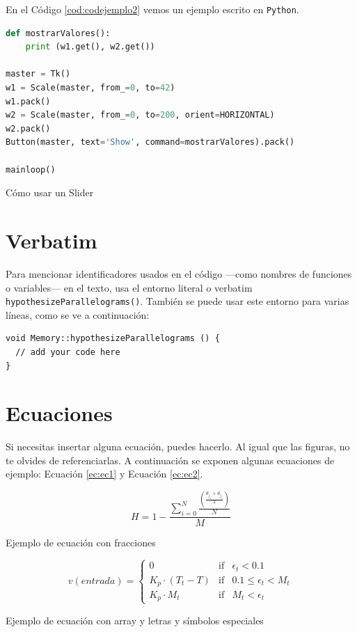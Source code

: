 En el Código \ref{cod:codejemplo2} vemos un ejemplo escrito en \texttt{Python}.

\begin{code}[h]
	\begin{lstlisting}[language=Python]
def mostrarValores():
    print (w1.get(), w2.get())

master = Tk()
w1 = Scale(master, from_=0, to=42)
w1.pack()
w2 = Scale(master, from_=0, to=200, orient=HORIZONTAL)
w2.pack()
Button(master, text='Show', command=mostrarValores).pack()

mainloop()
\end{lstlisting}
	\caption[Cómo usar un Slider]{Cómo usar un Slider}
	\label{cod:codejemplo2}
\end{code}

\section{Verbatim}

Para mencionar identificadores usados en el código ---como nombres de funciones
o variables--- en el texto, usa el entorno literal o verbatim
\verb|hypothesizeParallelograms()|. También se puede usar este entorno para varias líneas,
como se ve a continuación:

\begin{verbatim}
void Memory::hypothesizeParallelograms () {
  // add your code here
}
\end{verbatim}

\section{Ecuaciones}

Si necesitas insertar alguna ecuación, puedes hacerlo. Al igual que las
figuras, no te olvides de referenciarlas. A continuación se exponen algunas
ecuaciones de ejemplo: Ecuación \ref{ec:ec1} y Ecuación \ref{ec:ec2}.

\begin{myequation}[h]
	\begin{equation}
		H = 1 - \frac{\sum_{i=0}^{N}\frac{(\frac{d_{j_s} +
					d_{j_e}}{2})}{N}}{M}
		\nonumber
		\label{ec:ec1}
	\end{equation}
	\caption[Ejemplo de ecuación con fracciones]{Ejemplo de ecuación con
		fracciones}
\end{myequation}

\begin{myequation}[h]
	\begin{equation}
		v(entrada)= \left\{
		\begin{array}{lcc}
			0                   & \mbox{if} & \epsilon_t < 0.1
			\\
			K_p\cdot{(T_{t}-T)} & \mbox{if} & 0.1 \leq \epsilon_t <
			M_t
			\\
			K_p \cdot M_t       & \mbox{if} & M_t < \epsilon_t
		\end{array}
		\right.
		\label{ec:ec2}
	\end{equation}
	\caption[Ejemplo de ecuación con array y letras y símbolos
		especiales]{Ejemplo de ecuación con array y letras y símbolos
		especiales}
\end{myequation}

